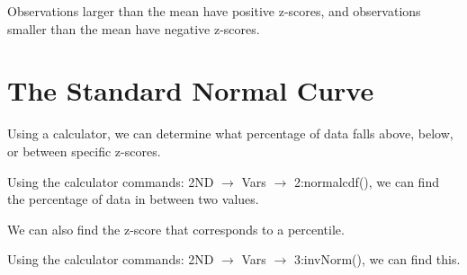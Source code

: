 \documentclass[../stats.tex]{subfiles}
\begin{document}
Observations larger than the mean have positive z-scores, and observations smaller than the mean have negative z-scores.

\section{The Standard Normal Curve}
Using a calculator, we can determine what percentage of data falls above, below, or between specific z-scores.

Using the calculator commands: 2ND $\rightarrow$ Vars $\rightarrow$ 2:normalcdf(), we can find the percentage of data in between two values. 

We can also find the z-score that corresponds to a percentile.

Using the calculator commands: 2ND $\rightarrow$ Vars $\rightarrow$ 3:invNorm(), we can find this.
\end{document}
